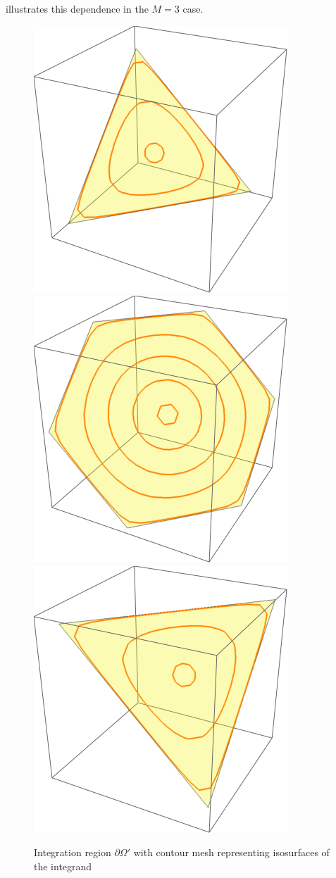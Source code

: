 \documentclass{article}[12pt]
\numberwithin{equation}{section}
\begin{document}
illustrates this dependence in the $M=3$ case.
\begin{figure}[H]
\centering{}
\captionsetup{justification=centering}
\includegraphics[scale=0.3]{figures/dos0}
\includegraphics[scale=0.3]{figures/dos1}
\includegraphics[scale=0.3]{figures/dos2}
\caption{Integration region $\partial\Omega'$ with contour mesh
representing isosurfaces of the integrand}
\label{fig:dos}
\end{figure}
\end{document}
